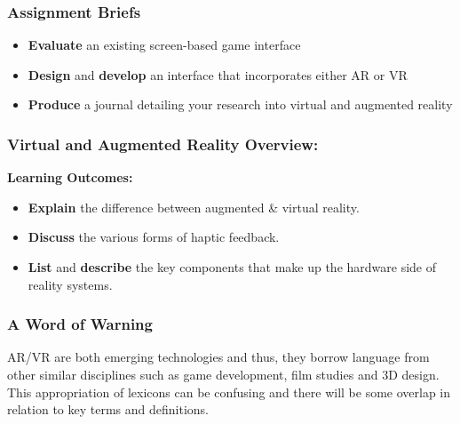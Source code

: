 \begin{frame}
	\frametitle{Assignment Briefs}
	\begin{itemize}
		\item \textbf{Evaluate} an existing screen-based game interface
		\item \textbf{Design} and \textbf{develop} an interface that incorporates either AR or VR
		\item \textbf{Produce} a journal detailing your research into virtual and augmented reality
	\end{itemize}
\end{frame}

\begin{frame}
	\frametitle{Virtual and Augmented Reality Overview:}
	
	\textbf{Learning Outcomes:}
	
	\begin{itemize}
		\item \textbf{Explain} the difference between augmented \& virtual reality. 
		\item \textbf{Discuss} the various forms of haptic feedback.
		\item \textbf{List} and \textbf{describe} the key components that make up the hardware side of reality systems.	
	\end{itemize}
\end{frame}

\begin{frame}
	\frametitle{A Word of Warning}
	AR/VR are both emerging technologies and thus, they borrow language from other similar disciplines such as game development, film studies and 3D design. This appropriation of lexicons can be confusing and there will be some overlap in relation to key terms and definitions.
\end{frame}

